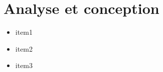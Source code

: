\section{Analyse et conception}


\begin{itemize}
\item item1
\item item2
\item item3
\end{itemize}
